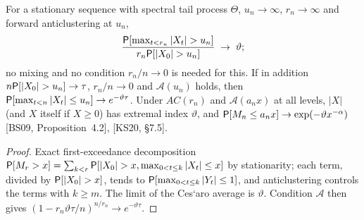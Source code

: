 \begin{theorem}
  \label{thm:theta-eq-vartheta}
  \leanok
  For a stationary sequence with spectral tail process $\Theta$, $u_n \to \infty$, $r_n \to \infty$
  and forward anticlustering at $u_n$,
  \begin{align*}
    \frac{\mathsf{P}[\max_{t < r_n} |X_t| > u_n]}{r_n \mathsf{P}[|X_0| > u_n]} \; \to \; \vartheta ;
  \end{align*}
  no mixing and no condition $r_n/n \to 0$ is needed for this. If in addition
  $n \mathsf{P}[|X_0| > u_n] \to \tau$, $r_n/n \to 0$ and $\mathcal A(u_n)$ holds, then
  $\mathsf{P}[\max_{t<n} |X_t| \le u_n] \to e^{-\vartheta\tau}$. Under $AC(r_n)$ and $\mathcal A(a_n x)$ at all
  levels, $|X|$ (and $X$ itself if $X \ge 0$) has extremal index $\vartheta$, and
  $\mathsf{P}[M_n \le a_n x] \to \exp(-\vartheta x^{-\alpha})$ [BS09, Proposition~4.2], [KS20, \S7.5].
\end{theorem}
\begin{proof}
  \leanok
  Exact first-exceedance decomposition
  $\mathsf{P}[M_r > x] = \sum_{k<r} \mathsf{P}[|X_0| > x, \max_{0 < t \le k} |X_t| \le x]$ by stationarity; each term,
  divided by $\mathsf{P}[|X_0| > x]$, tends to $\mathsf{P}[\max_{0<t\le k} |Y_t| \le 1]$, and anticlustering controls
  the terms with $k \ge m$. The limit of the Ces`aro average is $\vartheta$. Condition $\mathcal A$
  then gives $(1 - r_n \vartheta \tau / n)^{n/r_n} \to e^{-\vartheta\tau}$.
\end{proof}

